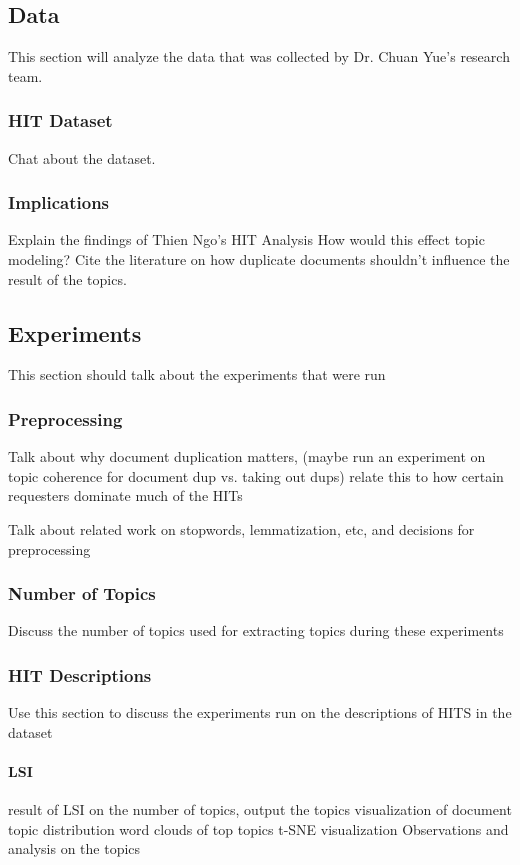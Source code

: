 \documentclass[letterpaper,12pt]{article}
\begin{document}
\subsection{Data}
This section will analyze the data that was collected by Dr. Chuan Yue's research team.

\subsubsection{HIT Dataset}
Chat about the dataset.

\subsubsection{Implications}
Explain the findings of Thien Ngo's HIT Analysis
How would this effect topic modeling?
Cite the literature on how duplicate documents shouldn't influence the result of the topics.

\subsection{Experiments}
This section should talk about the experiments that were run

\subsubsection{Preprocessing}
Talk about why document duplication matters,
(maybe run an experiment on topic coherence for document dup vs. taking out dups) relate this to
how certain requesters dominate much of the HITs

Talk about related work on stopwords, lemmatization, etc, and decisions for preprocessing

\subsubsection{Number of Topics}
Discuss the number of topics used for extracting topics during these experiments

\subsubsection{HIT Descriptions}
Use this section to discuss the experiments run on the descriptions of HITS in the dataset

\paragraph{LSI}
result of LSI on the number of topics, output the topics
visualization of document topic distribution
word clouds of top topics
t-SNE visualization
Observations and analysis on the topics
\end{document}
